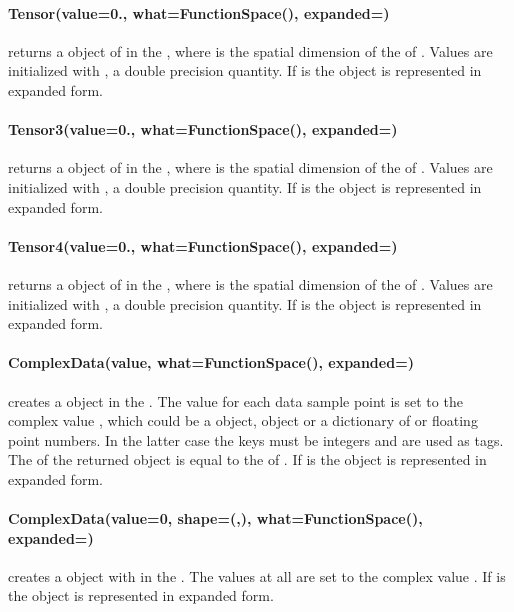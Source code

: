 \paragraph{Tensor(value=0., what=FunctionSpace(), expanded=\False)}
returns a \Data object of \Shape {} in the \FunctionSpace {},
where  is the spatial dimension of the \Domain of .
Values are initialized with , a double precision quantity.
If  is \True the \Data object is represented in expanded form.


\paragraph{Tensor3(value=0., what=FunctionSpace(), expanded=\False)}
returns a \Data object of \Shape {} in the \FunctionSpace {},
where  is the spatial dimension of the \Domain of .
Values are initialized with , a double precision quantity.
If  is \True the \Data object is represented in expanded form.


\paragraph{Tensor4(value=0., what=FunctionSpace(), expanded=\False)}
returns a \Data object of \Shape {} in the \FunctionSpace {},
where  is the spatial dimension of the \Domain of .
Values are initialized with , a double precision quantity.
If  is \True the \Data object is represented in expanded form.


\paragraph{ComplexData(value, what=FunctionSpace(), expanded=\False)}
creates a \Data object in the \FunctionSpace {}.
The value for each data sample point is set to the complex value , which could be a
\numpy object, \Data object or a dictionary of \numpy or floating point
numbers. In the latter case the keys must be integers and are used as tags.
The \Shape of the returned object is equal to the \Shape of .
If  is \True the \Data object is represented in expanded form.


\paragraph{ComplexData(value=0, shape=(,), what=FunctionSpace(), expanded=\False)}
creates a \Data object with \Shape {} in the \FunctionSpace {}.
The values at all \DataSamplePoints are set to the complex value .
If  is \True the \Data object is represented in expanded form.


